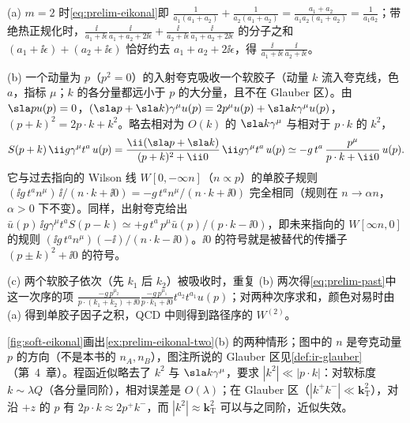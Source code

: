 \begin{example}[$m=2$ 的程函恒等式与入射夸克传播子的程函极限]\label{ex:prelim-eikonal-two}
(a) $m=2$ 时\cref{eq:prelim-eikonal}即 $\frac1{a_1(a_1+a_2)}+\frac1{a_2(a_1+a_2)}=\frac{a_1+a_2}{a_1a_2(a_1+a_2)}=\frac1{a_1a_2}$；带绝热正规化时，$\frac{\ii}{a_1+\ii\epsilon}\frac{\ii}{a_1+a_2+2\ii\epsilon}+\frac{\ii}{a_2+\ii\epsilon}\frac{\ii}{a_1+a_2+2\ii\epsilon}$ 的分子之和 $(a_1+\ii\epsilon)+(a_2+\ii\epsilon)$ 恰好约去 $a_1+a_2+2\ii\epsilon$，得 $\frac{\ii}{a_1+\ii\epsilon}\frac{\ii}{a_2+\ii\epsilon}$。
\par
(b) 一个动量为 $p$（$p^2=0$）的入射夸克吸收一个软胶子（动量 $k$ 流入夸克线，色 $a$，指标 $\mu$；$k$ 的各分量都远小于 $p$ 的大分量，且不在 Glauber 区）。由 $\sla pu(p)=0$，$(\sla p+\sla k)\gamma^\mu u(p)=2p^\mu u(p)+\sla k\gamma^\mu u(p)$，$(p+k)^2=2p\cdot k+k^2$。略去相对为 $O(k)$ 的 $\sla k\gamma^\mu$ 与相对于 $p\cdot k$ 的 $k^2$，
\begin{equation}\label{eq:prelim-eikonal-in}
S(p+k)\,\ii g\gamma^\mu t^a\,u(p)=\frac{\ii(\sla p+\sla k)}{(p+k)^2+\ii0}\,\ii g\gamma^\mu t^a\,u(p)\simeq-g\,t^a\,\frac{p^\mu}{p\cdot k+\ii0}\,u(p). %
\end{equation}
它与过去指向的 Wilson 线 $W[0,-\infty n]$（$n\propto p$）的单胶子规则 $(\ii g\,t^an^\mu)\,\ii/(n\cdot k+\ii0)=-g\,t^an^\mu/(n\cdot k+\ii0)$ 完全相同（规则在 $n\to\alpha n$，$\alpha>0$ 下不变）。同样，出射夸克给出 $\bar u(p)\,\ii g\gamma^\mu t^a S(p-k)\simeq+g\,t^a\,p^\mu\bar u(p)/(p\cdot k-\ii0)$，即未来指向的 $W[\infty n,0]$ 的规则 $(\ii g\,t^an^\mu)(-\ii)/(n\cdot k-\ii0)$。$\ii0$ 的符号就是被替代的传播子 $(p\pm k)^2+\ii0$ 的符号。
\par
(c) 两个软胶子依次（先 $k_1$ 后 $k_2$）被吸收时，重复 (b) 两次得\cref{eq:prelim-past}中这一次序的项 $\frac{-g\,p^{\mu_2}}{p\cdot(k_1+k_2)+\ii0}\frac{-g\,p^{\mu_1}}{p\cdot k_1+\ii0}t^{a_2}t^{a_1}u(p)$；对两种次序求和，颜色对易时由 (a) 得到单胶子因子之积，QCD 中则得到路径序的 $W^{(2)}$。
\end{example}

\cref{fig:soft-eikonal}画出\cref{ex:prelim-eikonal-two}(b) 的两种情形；图中的 $n$ 是夸克动量 $p$ 的方向（不是本书的 $n_A,n_B$），图注所说的 Glauber 区见\cref{def:ir-glauber}（第~4~章）。程函近似略去了 $k^2$ 与 $\sla k\gamma^\mu$，要求 $|k^2|\ll|p\cdot k|$：对软标度 $k\sim\lambda Q$（各分量同阶），相对误差是 $O(\lambda)$；在 Glauber 区（$|k^+k^-|\ll\mathbf k_{\mathrm T}^2$），对沿 $+z$ 的 $p$ 有 $2p\cdot k\approx2p^+k^-$，而 $|k^2|\approx\mathbf k_{\mathrm T}^2$ 可以与之同阶，近似失效。



